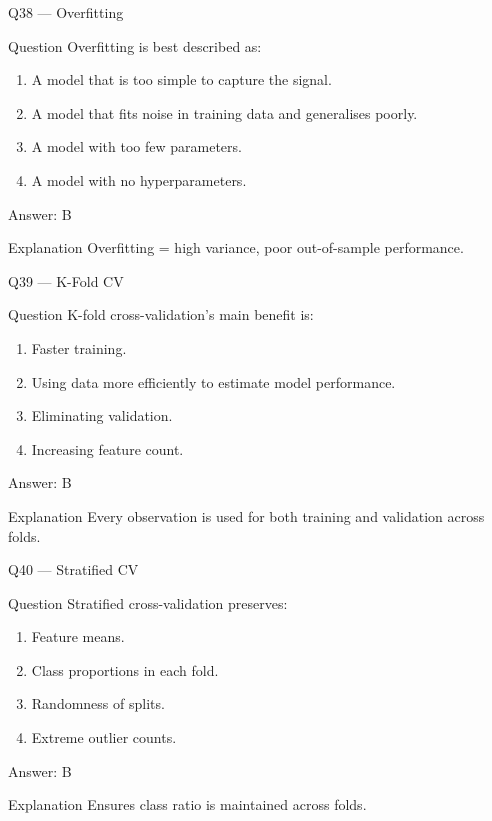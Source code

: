 \documentclass[aspectratio=169,8pt]{beamer}
\begin{document}
	\begin{frame}{Q38 --- Overfitting}
		\begin{block}{Question}
			Overfitting is best described as:
		\end{block}
		\begin{enumerate}
			\item A model that is too simple to capture the signal.
			\item A model that fits noise in training data and generalises poorly.
			\item A model with too few parameters.
			\item A model with no hyperparameters.
		\end{enumerate}
		\begin{exampleblock}{Answer: B}\end{exampleblock}
		\begin{block}{Explanation}
			Overfitting = high variance, poor out-of-sample performance.
		\end{block}
	\end{frame}
	
	\begin{frame}{Q39 --- K-Fold CV}
		\begin{block}{Question}
			K-fold cross-validation's main benefit is:
		\end{block}
		\begin{enumerate}
			\item Faster training.
			\item Using data more efficiently to estimate model performance.
			\item Eliminating validation.
			\item Increasing feature count.
		\end{enumerate}
		\begin{exampleblock}{Answer: B}\end{exampleblock}
		\begin{block}{Explanation}
			Every observation is used for both training and validation across folds.
		\end{block}
	\end{frame}
	
	\begin{frame}{Q40 --- Stratified CV}
		\begin{block}{Question}
			Stratified cross-validation preserves:
		\end{block}
		\begin{enumerate}
			\item Feature means.
			\item Class proportions in each fold.
			\item Randomness of splits.
			\item Extreme outlier counts.
		\end{enumerate}
		\begin{exampleblock}{Answer: B}\end{exampleblock}
		\begin{block}{Explanation}
			Ensures class ratio is maintained across folds.
		\end{block}
	\end{frame}
	
\end{document}

